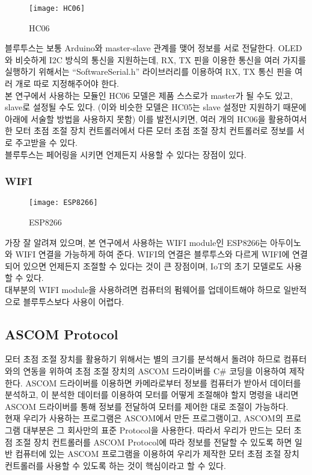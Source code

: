 \begin{wrapfigure}{l}{0.15\textwidth}
	\texttt{[image: HC06]}
	\caption{HC06}
	\label{fig:HC06}
\end{wrapfigure}
블루투스는 보통 Arduino와 master-slave 관계를 맺어 정보를 서로 전달한다. OLED와 비슷하게 I2C 방식의 통신을 지원하는데, RX, TX 핀을 이용한 통신을 여러 가지를 실행하기 위해서는 “SoftwareSerial.h” 라이브러리를 이용하여 RX, TX 통신 핀을 여러 개로 따로 지정해주어야 한다.\\
본 연구에서 사용하는 모듈인 HC06 모델은 제품 스스로가 master가 될 수도 있고, slave로 설정될 수도 있다. (이와 비슷한 모델은 HC05는 slave 설정만 지원하기 때문에 아래에 서술할 방법을 사용하지 못함) 이를 발전시키면, 여러 개의 HC06을 활용하여서 한 모터 초점 조절 장치 컨트롤러에서 다른 모터 초점 조절 장치 컨트롤러로 정보를 서로 주고받을 수 있다.\\
블루투스는 페어링을 시키면 언제든지 사용할 수 있다는 장점이 있다.

\subsubsection{WIFI}

\begin{wrapfigure}{l}{0.06\textwidth}
	\texttt{[image: ESP8266]}
	\caption{ESP8266}
	\label{fig:ESP8266}
\end{wrapfigure}
가장 잘 알려져 있으며, 본 연구에서 사용하는 WIFI module인 ESP8266는 아두이노와 WIFI 연결을 가능하게 하여 준다. WIFI의 연결은 블루투스와 다르게 WIFI에 연결되어 있으면 언제든지 조절할 수 있다는 것이 큰 장점이며, IoT의 초기 모델로도 사용할 수 있다.\\
대부분의 WIFI module을 사용하려면 컴퓨터의 펌웨어를 업데이트해야 하므로 일반적으로 블루투스보다 사용이 어렵다. 

\subsection{ASCOM Protocol}

모터 초점 조절 장치를 활용하기 위해서는 별의 크기를 분석해서 돌려야 하므로 컴퓨터와의 연동을 위하여 초점 조절 장치의 ASCOM 드라이버를 C\# 코딩을 이용하여 제작한다. ASCOM 드라이버를 이용하면 카메라로부터 정보를 컴퓨터가 받아서 데이터를 분석하고, 이 분석한 데이터를 이용하여 모터를 어떻게 조절해야 할지 명령을 내리면 ASCOM 드라이버를 통해 정보를 전달하여 모터를 제어한 대로 조절이 가능하다.\\
현재 우리가 사용하는 프로그램은 ASCOM에서 만든 프로그램이고, ASCOM의 프로그램 대부분은 그 회사만의 표준 Protocol을 사용한다. 따라서 우리가 만드는 모터 초점 조절 장치 컨트롤러를 ASCOM Protocol에 따라 정보를 전달할 수 있도록 하면 일반 컴퓨터에 있는 ASCOM 프로그램을 이용하여 우리가 제작한 모터 초점 조절 장치 컨트롤러를 사용할 수 있도록 하는 것이 핵심이라고 할 수 있다.




